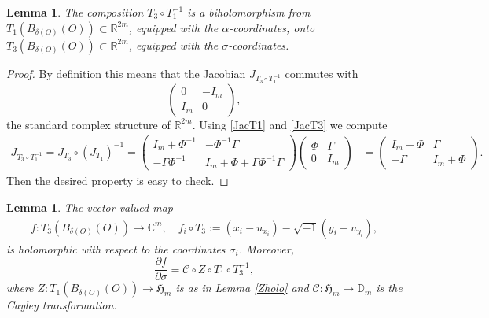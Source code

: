 \documentclass[11pt,reqno]{amsart}
\newcommand{\C}{\mathbb{C}}
\theoremstyle{plain}
\newtheorem{lemma}[theorem]{Lemma}
\theoremstyle{definition}
\numberwithin{equation}{section}
\begin{document}
\begin{lemma}\label{compose}
    The composition $T_{3}\circ T^{-1}_{1}$ is a biholomorphism from $T_1(B_{\delta(O)}(O)) \subset \mathbb{R}^{2m}$, equipped with the $\alpha$-coordinates, onto $T_3(B_{\delta(O)}(O)) \subset \mathbb{R}^{2m}$, equipped with the $\sigma$-coordinates.
\end{lemma}
    
\begin{proof}
By definition this means that the Jacobian $J_{T_3 \circ T_1^{-1}}$ commutes with
$$\begin{pmatrix}
    0 & -I_{m}  \\
     I_{m} & 0
\end{pmatrix},$$
the standard complex structure of $\mathbb{R}^{2m}$. Using \eqref{JacT1} and \eqref{JacT3} we compute
\begin{align*}
  J_{T_{3}\circ T^{-1}_{1}}    =  J_{T_{3}}\circ (J_{T_{1}})^{-1}
      = \begin{pmatrix}
        I_{m}+\Phi^{-1}  & -\Phi^{-1}\Gamma  \\
        -\Gamma\Phi^{-1}  & I_m+\Phi+\Gamma\Phi^{-1}\Gamma 
    \end{pmatrix}\begin{pmatrix}
         \Phi & \Gamma  \\
          0 & I_{m}
     \end{pmatrix}
     &= \begin{pmatrix}
         I_{m}+\Phi & \Gamma  \\
          -\Gamma & I_{m}+\Phi
   \end{pmatrix}.
     \end{align*}
Then the desired property is easy to check.
\end{proof}

\begin{lemma}\label{Holchart1}
    The vector-valued map
    \begin{align}\label{def_f}f:T_{3}(B_{\delta(O)}(O))\to \C^{m}, \quad f_{i} \circ T_3 :=(x_{i}-u_{x_{i}})-\sqrt{-1}(y_{i}-u_{y_{i}}),\end{align}
    is holomorphic with respect to the coordinates $\sigma_i$. Moreover,
    $$\frac{\partial f}{\partial \sigma}=\mathscr{C} \circ Z \circ T_1 \circ T_3^{-1},$$
    where $Z: T_1(B_{\delta(O)}(O)) \to \mathfrak{H}_m$ is as in Lemma \ref{Zholo} and $\mathscr{C}: \mathfrak{H}_m \to \mathbb{D}_m$ is the Cayley transformation.
\end{lemma}
\end{document}
